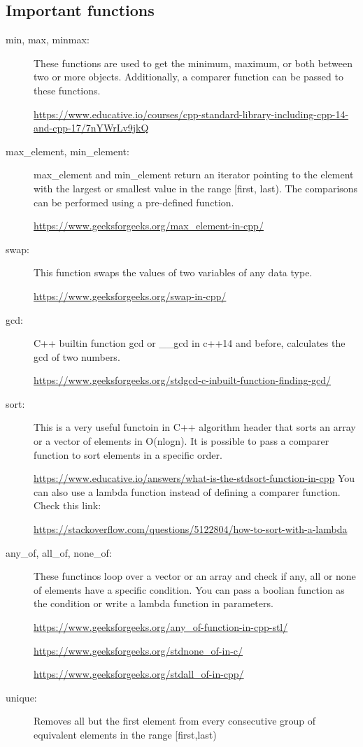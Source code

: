 \documentclass[12pt, a4paper]{article}
\begin{document}
\subsection{Important functions}
\begin{description}
\item[min, max, minmax:] These functions are used to get the minimum, maximum, or both between two or more objects. Additionally, a comparer function can be passed to these functions.

\url{https://www.educative.io/courses/cpp-standard-library-including-cpp-14-and-cpp-17/7nYWrLv9jkQ}

\item[max\_element, min\_element:] max\_element and min\_element return an iterator pointing to the element with the largest or smallest value in the range [first, last). The comparisons can be performed using a pre-defined function.

\url{https://www.geeksforgeeks.org/max_element-in-cpp/}
\item[swap:] This function swaps the values of two variables of any data type.

\url{https://www.geeksforgeeks.org/swap-in-cpp/}
\item[gcd:] C++ builtin function gcd or \_\_gcd in c++14 and before, calculates the gcd of two numbers.

\url{https://www.geeksforgeeks.org/stdgcd-c-inbuilt-function-finding-gcd/}
\item[sort:] This is a very useful functoin in C++ algorithm header that sorts an array or a vector of elements in O(nlogn). It is possible to pass a comparer function to sort elements in a specific order.

\url{https://www.educative.io/answers/what-is-the-stdsort-function-in-cpp}
You can also use a lambda function instead of defining a comparer function. Check this link:

\url{https://stackoverflow.com/questions/5122804/how-to-sort-with-a-lambda}
\item[any\_of, all\_of, none\_of:] These functinos loop over a vector or an array and check if any, all or none of elements have a specific condition. You can pass a boolian function as the condition or write a lambda function in parameters.

\url{https://www.geeksforgeeks.org/any_of-function-in-cpp-stl/}

\url{https://www.geeksforgeeks.org/stdnone_of-in-c/}

\url{https://www.geeksforgeeks.org/stdall_of-in-cpp/}
\item[unique:] Removes all but the first element from every consecutive group of equivalent elements in the range [first,last)


\end{description}
\end{document}
